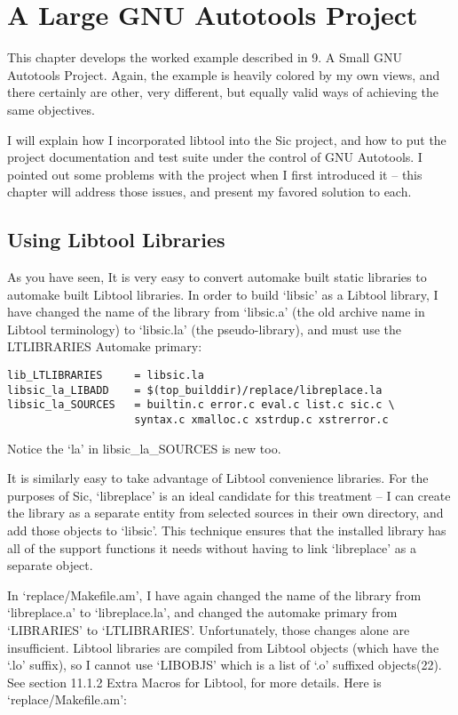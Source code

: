 \chapter{A Large GNU Autotools Project}\label{C_A_Large_GNU_Autotools_Project}


This chapter develops the worked example described in 9. A Small GNU Autotools Project. Again, the example is heavily colored by my own views, and there certainly are other, very different, but equally valid ways of achieving the same objectives. 


I will explain how I incorporated libtool into the Sic project, and how to put the project documentation and test suite under the control of GNU Autotools. I pointed out some problems with the project when I first introduced it -- this chapter will address those issues, and present my favored solution to each. 

\section{Using Libtool Libraries}


As you have seen, It is very easy to convert automake built static libraries to automake built Libtool libraries. In order to build `libsic' as a Libtool library, I have changed the name of the library from `libsic.a' (the old archive name in Libtool terminology) to `libsic.la' (the pseudo-library), and must use the LTLIBRARIES Automake primary: 

\begin{Verbatim}[frame=single]
lib_LTLIBRARIES     = libsic.la
libsic_la_LIBADD    = $(top_builddir)/replace/libreplace.la
libsic_la_SOURCES   = builtin.c error.c eval.c list.c sic.c \
                    syntax.c xmalloc.c xstrdup.c xstrerror.c
\end{Verbatim}

Notice the `la' in libsic\_{}la\_{}SOURCES is new too. 

It is similarly easy to take advantage of Libtool convenience libraries. For the purposes of Sic, `libreplace' is an ideal candidate for this treatment -- I can create the library as a separate entity from selected sources in their own directory, and add those objects to `libsic'. This technique ensures that the installed library has all of the support functions it needs without having to link `libreplace' as a separate object. 


In `replace/Makefile.am', I have again changed the name of the library from
 `libreplace.a' to `libreplace.la', and changed the automake primary from `LIBRARIES' to `LTLIBRARIES'. Unfortunately, those changes alone are insufficient. Libtool libraries are compiled from Libtool objects (which have the `.lo' suffix), so I cannot use `LIBOBJS' which is a list of `.o' suffixed objects(22). See section 11.1.2 Extra Macros for Libtool, for more details. Here is `replace/Makefile.am': 

